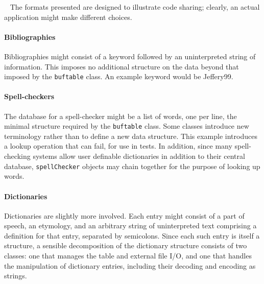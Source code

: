 \medskip{}\ {\sffamily
The formats presented are designed to illustrate code
sharing; clearly, an actual application might make different choices.}\medskip

\paragraph{Bibliographies}
Bibliographies might consist of a keyword followed by an uninterpreted
string of information. This imposes no additional structure on the data
beyond that imposed by the \texttt{buftable} class. An example keyword
would be Jeffery99.


\paragraph{Spell-checkers}
The database for a spell-checker might be a list of words, one per
line, the minimal structure required by the \texttt{buftable} class.
Some classes introduce new terminology rather
than to define a new data structure. This example introduces a lookup
operation that can fail, for use in tests. In addition, since many
spell-checking systems allow user definable dictionaries in addition to
their central database, \texttt{spellChecker} objects may chain
together for the purpose of looking up words.


\paragraph{Dictionaries}
Dictionaries are slightly more involved. Each entry might consist of a
part of speech, an etymology, and an arbitrary string of uninterpreted
text comprising a definition for that entry, separated by semicolons.
Since each such entry is itself a structure, a sensible decomposition
of the dictionary structure consists of two classes: one that manages
the table and external file I/O, and one that handles the manipulation
of dictionary entries, including their decoding and encoding as
strings.

